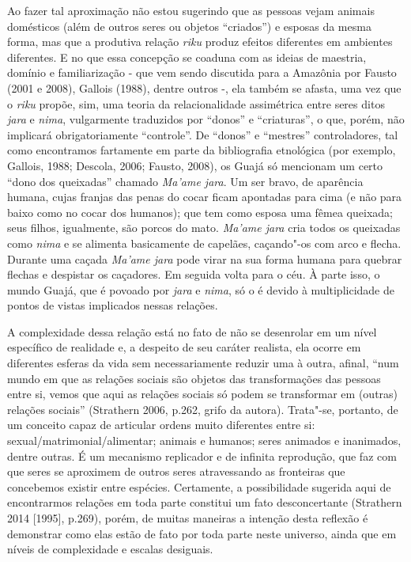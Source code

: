 Ao fazer tal aproximação não estou sugerindo que as pessoas vejam
animais domésticos (além de outros seres ou objetos ``criados'') e esposas
da mesma forma, mas que a produtiva relação \emph{riku} produz efeitos
diferentes em ambientes diferentes. E no que essa concepção se coaduna
com as ideias de maestria, domínio e familiarização - que vem sendo
discutida para a Amazônia por Fausto (2001 e 2008), Gallois (1988),
dentre outros -, ela também se afasta, uma vez que o \emph{riku} propõe,
sim, uma teoria da relacionalidade assimétrica entre seres ditos
\emph{jara} e \emph{nima}, vulgarmente traduzidos por ``donos'' e
``criaturas'', o que, porém, não implicará obrigatoriamente ``controle''. De
``donos'' e ``mestres'' controladores, tal como encontramos fartamente em
parte da bibliografia etnológica (por exemplo, Gallois, 1988; Descola,
2006; Fausto, 2008), os Guajá só mencionam um certo ``dono dos queixadas''
chamado \emph{Ma'ame jara}. Um ser bravo, de aparência humana, cujas
franjas das penas do cocar ficam apontadas para cima (e não para baixo
como no cocar dos humanos); que tem como esposa uma fêmea queixada; seus
filhos, igualmente, são porcos do mato. \emph{Ma'ame jara} cria todos os
queixadas como \emph{nima} e se alimenta basicamente de capelães,
caçando"-os com arco e flecha. Durante uma caçada \emph{Ma'ame jara} pode
virar na sua forma humana para quebrar flechas e despistar os caçadores.
Em seguida volta para o céu. À parte isso, o mundo Guajá, que é povoado
por \emph{jara} e \emph{nima}, só o é devido à multiplicidade de pontos
de vistas implicados nessas relações.

A complexidade dessa relação está no fato de não se desenrolar em um
nível específico de realidade e, a despeito de seu caráter realista, ela
ocorre em diferentes esferas da vida sem necessariamente reduzir uma à
outra, afinal, ``num mundo em que as relações sociais são objetos das
transformações das pessoas entre si, vemos que aqui as relações sociais
só podem se transformar em (outras) relações sociais'' (Strathern 2006,
p.262, grifo da autora). Trata"-se, portanto, de um conceito capaz de
articular ordens muito diferentes entre si:
sexual/matrimonial/alimentar; animais e humanos; seres animados e
inanimados, dentre outras. É um mecanismo replicador e de infinita
reprodução, que faz com que seres se aproximem de outros seres
atravessando as fronteiras que concebemos existir entre espécies.
Certamente, a possibilidade sugerida aqui de encontrarmos relações em
toda parte constitui um fato desconcertante (Strathern 2014 {[}1995{]},
p.269), porém, de muitas maneiras a intenção desta reflexão é demonstrar
como elas estão de fato por toda parte neste universo, ainda que em
níveis de complexidade e escalas desiguais.

